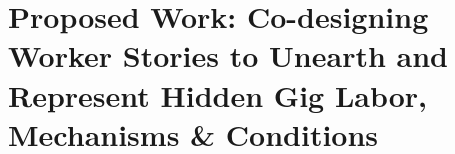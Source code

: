 \chapter{Proposed Work: Co-designing Worker Stories to Unearth and Represent Hidden Gig Labor, Mechanisms \& Conditions}\label{ch:mathtest} 




